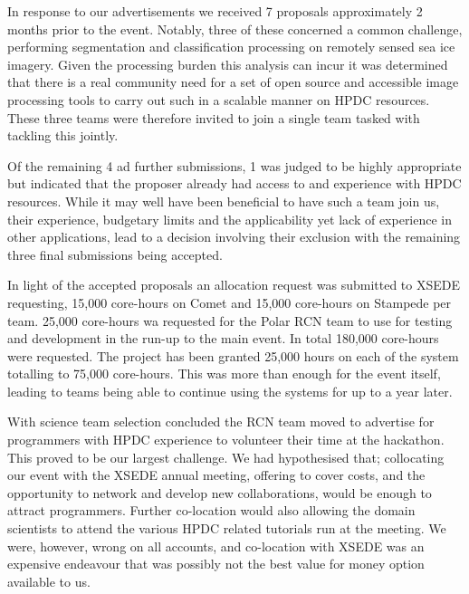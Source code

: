 \documentclass[conference]{IEEEtran}
\begin{document}
In response to our advertisements we received 7 proposals approximately 2 months prior to the event.  Notably, three of these concerned a common challenge, performing segmentation and classification processing on remotely sensed sea ice imagery.   Given the processing burden this analysis can incur it was determined that there is a real community need for a set of open source and accessible image processing tools to carry out such in a scalable manner on HPDC resources.  These three teams were therefore invited to join a single team tasked with tackling this jointly.  

Of the remaining 4 ad further submissions, 1 was judged to be highly appropriate but indicated that the proposer already had access to and experience with HPDC resources.  While it may well have been beneficial to have such a team join us, their experience, budgetary limits and the applicability yet lack of experience in other applications, lead to a decision involving their exclusion with the remaining three final submissions being accepted.  

In light of the accepted proposals an allocation request was submitted to XSEDE requesting, 
15,000 core-hours on Comet and 15,000 core-hours on Stampede per team.  25,000 core-hours wa requested for the Polar RCN team to use for testing and development in the run-up to the main event.  In total 180,000 core-hours were requested.   The project has been granted 25,000 hours on each of the system totalling to 75,000 core-hours. This was more than enough for the event itself, leading to teams being able to continue using the systems for up to a year later.

With science team selection concluded the RCN team moved to advertise for programmers with HPDC experience to volunteer their time at the hackathon.  This proved to be our largest challenge.  We had hypothesised that; collocating our event with the XSEDE annual meeting, offering to cover costs, and the opportunity to network and develop new collaborations, would be enough to attract programmers.  Further co-location would also allowing the domain scientists to attend the various HPDC related tutorials run at the meeting.  We were, however, wrong on all accounts, and co-location with XSEDE was an expensive endeavour that was possibly not the best value for money option available to us.  

\end{document}
